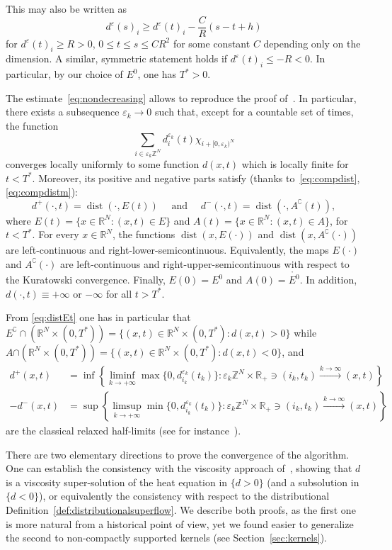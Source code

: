 \documentclass[10pt]{amsart}
\theoremstyle{plain}
\theoremstyle{definition}
\newcommand{\R}{\mathbb{R}}
\newcommand{\Z}{\mathbb{Z}}
\newcommand{\comp}[1]{{#1}^\complement}
\DeclareMathOperator{\dist}{dist}
\newcommand{\e}{\varepsilon}
\numberwithin{equation}{section}
\begin{document}
This may also be written as 
\begin{equation}\label{eq:nondecreasing}
  d^\e(s)_i \ge d^\e(t)_i - \frac CR(s-t+h)
\end{equation}
for $d^\e(t)_i\ge R>0$, $0\le t\le s\le CR^2$ for some constant $C$ depending
only on the dimension. A similar, symmetric statement holds if $d^\e(t)_i\le -R<0$.
In particular, by our choice of $E^0$, one has $T^*>0$.

The estimate~\eqref{eq:nondecreasing} allows to reproduce the proof of~\cite[Prop.~4.4]{CMP17}.  {In particular, there exists  a subsequence $\e_k\to 0$ such that,  except for a countable set of times, the function
\[
\sum_{i\in\e_k\Z^N} d^{\e_k}_i(t)\chi_{i+[0,\e_k)^N}
\]
converges locally uniformly to some function $d(x,t)$ which
is locally finite for $t<T^*$. Moreover,  its positive and negative parts
 satisfy (thanks to~\eqref{eq:compdist}, \eqref{eq:compdistm}):}
\begin{equation}\label{eq:distEt}
  d^+(\cdot,t) = \dist(\cdot,E(t))
  \quad\text{ and }\quad
  d^-(\cdot,t) = \dist(\cdot,\comp{A}(t)),
\end{equation}
where $E(t) = \{x\in\R^N: (x,t)\in E\}$ and $A(t) = \{x\in\R^N:(x,t)\in A\}$,
for $t<T^*$. For every $x\in\R^N$, the functions $\dist(x,E(\cdot))$ and $\dist(x,\comp{A}(\cdot))$ are
left-continuous and right-lower-semicontinuous. Equivalently, the maps $E(\cdot)$ and $\comp{A}(\cdot)$ are left-continuous and right-upper-semicontinuous with respect to the
Kuratowski convergence. Finally, $E(0)=E^0$ and $A(0)=\mathring{E^0}$.
In addition, $d(\cdot,t)\equiv +\infty$ or $-\infty$  for all $t>T^*$.



From \eqref{eq:distEt} one has in particular that $\comp{E}\cap (\R^N\times (0,T^*))
= \{(x,t)\in \R^N\times (0,T^*): d(x,t)>0\}$ while
$A  {\cap (\R^N\times (0,T^*))}= \{(x,t)\in \R^N\times (0,T^*): d(x,t)<0\}$, and
\begin{align*}
    d^+(x,t)& = \inf\left\{ \liminf_{k\to+\infty} \max\{0,d^{ {\e_k}}_{i_k}(t_k)\}: \e_k\Z^N\times \R_+\ni (i_k,t_k)\stackrel{k\to\infty}{\longrightarrow} (x,t)\right\}\\
    -d^-(x,t)& = \sup\left\{ \limsup_{k\to+\infty} \min\{0,d^{ {\e_k}}_{i_k}(t_k)\}: \e_k\Z^N\times \R_+\ni (i_k,t_k)\stackrel{k\to\infty}{\longrightarrow} (x,t)\right\}
\end{align*}
are the classical relaxed half-limits (see for instance~\cite{BarSonSou,BarSou}).

There are two elementary directions to prove the convergence
of the algorithm. One can establish the consistency with the
viscosity approach of~\cite{Soner93}, showing that $d$ is a viscosity
super-solution of the heat equation in $\{d>0\}$ (and a subsolution
in $\{d<0\}$), or equivalently the
consistency with respect to the distributional
Definition~\ref{def:distributionalsuperflow}.
We describe both proofs, as the first one is more natural
from a historical point of view, yet we found  easier to generalize
the second to non-compactly supported kernels (see Section~\ref{sec:kernels}).
\end{document}
